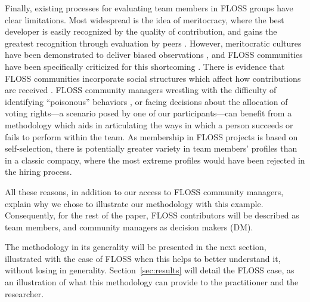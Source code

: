 Finally, existing processes for evaluating team members in FLOSS groups have clear limitations. Most widespread is the idea of meritocracy, where the best developer is easily recognized by the quality of contribution, and gains the greatest recognition through evaluation by peers \citep{scacchi:2007:free}. However, meritocratic cultures have been demonstrated to deliver biased observations \citep{castilla:2010:paradox}, and FLOSS communities have been specifically criticized for this shortcoming \citep{reagle:2012:free,nafus:2012:patches}. There is evidence that FLOSS communities incorporate social structures which affect how contributions are received \citep{vonkrogh:2003:community,ducheneaut:2005:socialization,tsay:2014:influence,keertipati:2016:exploring}. FLOSS community managers wrestling with the difficulty of identifying ``poisonous'' behaviors \citep{carillo:2016:dose}, or facing decisions about the allocation of voting rights---a scenario posed by one of our participants---can benefit from a methodology which aids in articulating the ways in which a person succeeds or fails to perform within the team. As membership in FLOSS projects is based on self-selection, there is potentially greater variety in team members' profiles than in a classic company, where the most extreme profiles would have been rejected in the hiring process.

All these reasons, in addition to our access to FLOSS community managers, explain why we chose to illustrate our methodology with this example. Consequently, for the rest of the paper, FLOSS contributors will be described as team members, and community managers as decision makers (DM).

The methodology in its generality will be presented in the next section, illustrated with the case of FLOSS when this helps to better understand it, without losing in generality. Section~\ref{sec:results} will detail the FLOSS case, as an illustration of what this methodology can provide to the practitioner and the researcher.
